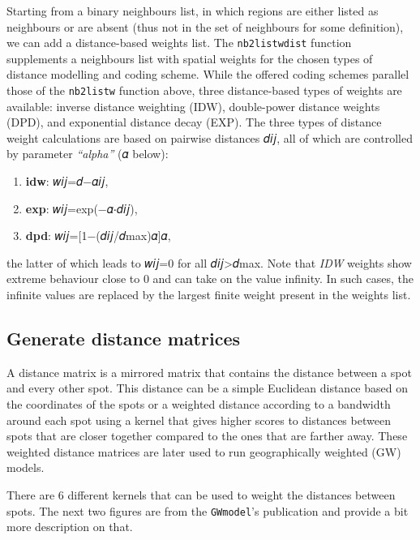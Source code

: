 \documentclass[
]{book}
\providecommand{\tightlist}{%
  \setlength{\itemsep}{0pt}\setlength{\parskip}{0pt}}
\begin{document}
Starting from a binary neighbours list, in which regions are either listed as neighbours or are absent (thus not in the set of neighbours for some definition), we can add a distance-based weights list. The \texttt{nb2listwdist} function supplements a neighbours list with spatial weights for the chosen types of distance modelling and coding scheme. While the offered coding schemes parallel those of the \texttt{nb2listw} function above, three distance-based types of weights are available: inverse distance weighting (IDW), double-power distance weights (DPD), and exponential distance decay (EXP). The three types of distance weight calculations are based on pairwise distances 𝑑𝑖𝑗, all of which are controlled by parameter \emph{``alpha''} (𝛼 below):

\begin{enumerate}
\def\labelenumi{\arabic{enumi}.}
\tightlist
\item
  \textbf{idw}: 𝑤𝑖𝑗=𝑑−𝛼𝑖𝑗,
\item
  \textbf{exp}: 𝑤𝑖𝑗=exp(−𝛼⋅𝑑𝑖𝑗),
\item
  \textbf{dpd}: 𝑤𝑖𝑗={[}1−(𝑑𝑖𝑗/𝑑max)𝛼{]}𝛼,
\end{enumerate}

the latter of which leads to 𝑤𝑖𝑗=0 for all 𝑑𝑖𝑗\textgreater 𝑑max. Note that \emph{IDW} weights show extreme behaviour close to 0 and can take on the value infinity. In such cases, the infinite values are replaced by the largest finite weight present in the weights list.

\hypertarget{generate-distance-matrices}{%
\subsection{Generate distance matrices}\label{generate-distance-matrices}}

A distance matrix is a mirrored matrix that contains the distance between a spot and every other spot. This distance can be a simple Euclidean distance based on the coordinates of the spots or a weighted distance according to a bandwidth around each spot using a kernel that gives higher scores to distances between spots that are closer together compared to the ones that are farther away. These weighted distance matrices are later used to run geographically weighted (GW) models.

There are 6 different kernels that can be used to weight the distances between spots. The next two figures are from the \texttt{GWmodel}'s publication \citep{Gollini2015Feb} and provide a bit more description on that.
\end{document}
